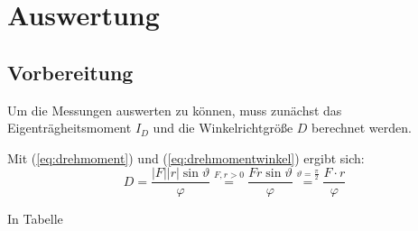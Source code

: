 \section{Auswertung}
\label{sec:Auswertung}

\subsection{Vorbereitung}\label{subsec:Vorbereitung}
Um die Messungen auswerten zu können, muss zunächst das Eigenträgheitsmoment $I_{D}$ und die Winkelrichtgröße $D$ berechnet werden.

Mit (\ref{eq:drehmoment}) und (\ref{eq:drehmomentwinkel}) ergibt sich:
\begin{equation}
D = \frac{\lvert F \rvert \lvert r \rvert \sin{\vartheta}}{\varphi} \stackrel{F,r > 0}{=} \frac{F r \sin{\vartheta}}{\varphi} 
\stackrel{\vartheta = \frac{\pi}{2}}{=} \frac{F \cdot r}{\varphi}
\end{equation}

In Tabelle %

